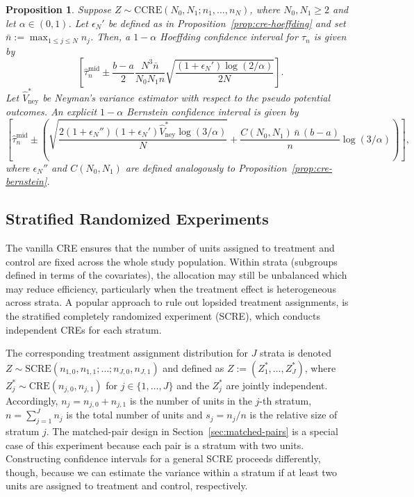 \documentclass[aos]{imsart2}
\theoremstyle{plain}
\newtheorem{proposition}[theorem]{Proposition}
\theoremstyle{definition}
\newcommand{\vhn}{\hat{V}_{\mathrm{ney}}}
\newcommand{\tauhm}{\hat{\tau}^{\mathrm{mid}}}
\newcommand{\cre}{\mathrm{CRE}}
\newcommand{\nb}{\bar{n}}
\begin{document}
\begin{proposition}
    Suppose $Z\sim \mathrm{CCRE}(N_0, N_1; n_1,\ldots,n_N)$, where $N_0, N_1 \geq 2$ and let $\alpha \in(0,1)$. Let $\epsilon_N'$ be defined as in Proposition~\ref{prop:cre-hoeffding} and set $\nb := \max_{1\leq j\leq N} n_j$. Then, a $1-\alpha$ Hoeffding confidence interval for $\tau_n$ is given by
    \begin{equation*}
        \left[\tauhm_n \pm \frac{b-a}{2} \frac{N^3 \nb}{N_0N_1n}\sqrt{\frac{(1+\epsilon_N')\log(2/\alpha)}{2N}}\right].
    \end{equation*}
    Let $\vhn^*$ be Neyman's variance estimator with respect to the pseudo potential outcomes. An explicit $1-\alpha$ Bernstein confidence interval is given by
    \begin{equation*}
        \left[\tauhm_n \pm \left(\sqrt{\frac{2(1+\epsilon_N'')(1+\epsilon_N') \vhn^* \log(3/\alpha)}{N}} + \frac{C(N_0,N_1)\,\nb\,(b-a)}{n} \log(3/\alpha)\right)\right],
    \end{equation*}
    where $\epsilon_N''$ and $C(N_0, N_1)$ are defined analogously to Proposition~\ref{prop:cre-bernstein}.
\end{proposition}



\subsection{Stratified Randomized Experiments} The vanilla CRE ensures that the number of units assigned to treatment and control are fixed across the whole study population. Within strata (subgroups defined in terms of the covariates), the allocation may still be unbalanced which may reduce efficiency, particularly when the treatment effect is heterogeneous across strata. A popular approach to rule out lopsided treatment assignments, is the stratified completely randomized experiment (SCRE), which conducts independent CREs for each stratum.

The corresponding treatment assignment distribution for $J$ strata is denoted $Z \sim \mathrm{SCRE}(n_{1,0}, n_{1,1};\ldots;n_{J,0},n_{J,1})$ and defined as $Z:=(Z^*_{1}, \ldots,Z^*_{J})$, where $Z^*_{j}\sim \cre(n_{j,0},n_{j,1})$ for $j \in \{1,\ldots,J\}$ and the $Z^*_j$ are jointly independent. Accordingly, $n_j=n_{j,0}+n_{j,1}$ is the number of units in the $j$-th stratum, $n = \sum_{j=1}^J n_j$ is the total number of units and $s_j = n_j/n$ is the relative size of stratum $j$. The matched-pair design in Section~\ref{sec:matched-pairs} is a special case of this experiment because each pair is a stratum with two units. Constructing confidence intervals for a general SCRE proceeds differently, though, because we can estimate the variance within a stratum if at least two units are assigned to treatment and control, respectively.
\end{document}
